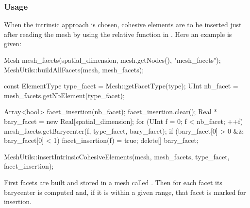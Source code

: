 \subsubsection{Usage}
When the intrinsic approach is chosen, cohesive elements are to be
inserted just after reading the mesh by using the relative function in
. Here an example is given:
\begin{cpp}
  Mesh mesh_facets(spatial_dimension, mesh.getNodes(), "mesh_facets");
  MeshUtils::buildAllFacets(mesh, mesh_facets);

  const ElementType type_facet = Mesh::getFacetType(type);
  UInt nb_facet = mesh_facets.getNbElement(type_facet);

  Array<bool> facet_insertion(nb_facet);
  facet_insertion.clear();
  Real * bary_facet = new Real[spatial_dimension];
  for (UInt f = 0; f < nb_facet; ++f) {
    mesh_facets.getBarycenter(f, type_facet, bary_facet);
    if (bary_facet[0] > 0 && bary_facet[0] < 1) facet_insertion(f) = true;
  }
  delete[] bary_facet;

  MeshUtils::insertIntrinsicCohesiveElements(mesh,
					     mesh_facets,
					     type_facet,
					     facet_insertion);
\end{cpp}
First facets are built and stored in a mesh called
. Then for each facet its barycenter is computed
and, if it is within a given range, that facet is marked for
insertion.

